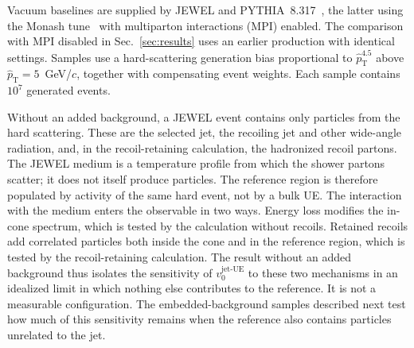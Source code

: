 \documentclass[aps,prc,twocolumn,superscriptaddress,nofootinbib,longbibliography,floatfix,10pt]{revtex4-2}
\newcommand{\vjet}{{v_0^{\mathrm{jet\text{-}UE}}}}
\begin{document}
Vacuum baselines are supplied by JEWEL and PYTHIA~8.317~\cite{Pythia}, the latter using the Monash tune~\cite{Monash} with multiparton interactions (MPI) enabled. The comparison with MPI disabled in Sec.~\ref{sec:results} uses an earlier production with identical settings. Samples use a hard-scattering generation bias proportional to $\hat p_{\mathrm T}^{4.5}$ above $\hat p_{\mathrm T}=5$~GeV/$c$, together with compensating event weights. Each sample contains $10^7$ generated events.

Without an added background, a JEWEL event contains only particles from the hard scattering. These are the selected jet, the recoiling jet and other wide-angle radiation, and, in the recoil-retaining calculation, the hadronized recoil partons. The JEWEL medium is a temperature profile from which the shower partons scatter; it does not itself produce particles. The reference region is therefore populated by activity of the same hard event, not by a bulk UE. The interaction with the medium enters the observable in two ways. Energy loss modifies the in-cone spectrum, which is tested by the calculation without recoils. Retained recoils add correlated particles both inside the cone and in the reference region, which is tested by the recoil-retaining calculation. The result without an added background thus isolates the sensitivity of $\vjet$ to these two mechanisms in an idealized limit in which nothing else contributes to the reference. It is not a measurable configuration. The embedded-background samples described next test how much of this sensitivity remains when the reference also contains particles unrelated to the jet.
\end{document}
